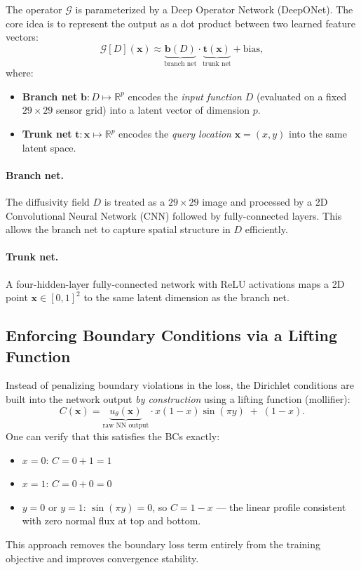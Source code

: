 \documentclass[11pt]{article}
\begin{document}
The operator $\mathcal{G}$ is parameterized by a Deep Operator Network
(DeepONet).  The core idea is to represent the output as a dot product
between two learned feature vectors:
\begin{equation}
  \mathcal{G}[D](\mathbf{x})
  \approx
  \underbrace{\boldsymbol{b}(D)}_{\text{branch net}}
  \cdot
  \underbrace{\boldsymbol{t}(\mathbf{x})}_{\text{trunk net}}
  + \text{bias},
\end{equation}
where:
\begin{itemize}
  \item \textbf{Branch net} $\boldsymbol{b}: D \mapsto \mathbb{R}^p$ encodes
        the \emph{input function} $D$ (evaluated on a fixed $29\times29$
        sensor grid) into a latent vector of dimension $p$.
  \item \textbf{Trunk net} $\boldsymbol{t}: \mathbf{x} \mapsto \mathbb{R}^p$
        encodes the \emph{query location} $\mathbf{x}=(x,y)$ into the same
        latent space.
\end{itemize}

\paragraph{Branch net.}
The diffusivity field $D$ is treated as a $29\times29$ image and processed
by a 2D Convolutional Neural Network (CNN) followed by fully-connected
layers.  This allows the branch net to capture spatial structure in $D$
efficiently.

\paragraph{Trunk net.}
A four-hidden-layer fully-connected network with $\mathrm{ReLU}$ activations
maps a 2D point $\mathbf{x} \in [0,1]^2$ to the same latent dimension as the
branch net.

\subsection{Enforcing Boundary Conditions via a Lifting Function}

Instead of penalizing boundary violations in the loss, the Dirichlet
conditions are built into the network output \emph{by construction} using a
lifting function (mollifier):
\begin{equation}
  C(\mathbf{x}) = \underbrace{u_\theta(\mathbf{x})}_{\text{raw NN output}}
  \cdot x(1-x)\sin(\pi y)
  \;+\; (1 - x).
  \label{eq:mollifier}
\end{equation}
One can verify that this satisfies the BCs exactly:
\begin{itemize}
  \item $x=0$: $C = 0 + 1 = 1$ \checkmark
  \item $x=1$: $C = 0 + 0 = 0$ \checkmark
  \item $y=0$ or $y=1$: $\sin(\pi y)=0$, so $C = 1-x$ — the linear profile
        consistent with zero normal flux at top and bottom. \checkmark
\end{itemize}
This approach removes the boundary loss term entirely from the training
objective and improves convergence stability.
\end{document}

